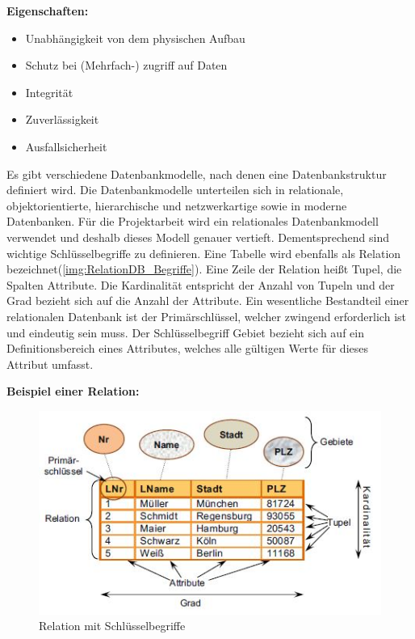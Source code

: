 \documentclass[a4paper,titlepage,halfparskip,12pt]{scrreprt}
\begin{document}
\begin{onehalfspacing}
\smallskip

\textbf{Eigenschaften:}
\begin{itemize}
	\item Unabhängigkeit von dem physischen Aufbau
	\item Schutz bei (Mehrfach-) zugriff auf Daten
	\item Integrität
	\item Zuverlässigkeit
	\item Ausfallsicherheit
\end{itemize}

Es gibt verschiedene Datenbankmodelle, nach denen eine Datenbankstruktur definiert wird. Die Datenbankmodelle unterteilen sich in relationale, objektorientierte, hierarchische und netzwerkartige sowie in moderne Datenbanken. Für die Projektarbeit wird ein relationales Datenbankmodell verwendet und deshalb dieses Modell genauer vertieft. Dementsprechend sind wichtige Schlüsselbegriffe zu definieren. Eine Tabelle wird ebenfalls als Relation bezeichnet(\autoref{img:RelationDB_Begriffe}). Eine Zeile der Relation heißt Tupel, die Spalten Attribute. Die Kardinalität entspricht der Anzahl von Tupeln und der Grad bezieht sich auf die Anzahl der Attribute. Ein wesentliche Bestandteil einer relationalen Datenbank ist der Primärschlüssel, welcher zwingend erforderlich ist und eindeutig sein muss. Der Schlüsselbegriff Gebiet bezieht sich auf ein Definitionsbereich eines Attributes, welches alle gültigen Werte für dieses Attribut umfasst. \cite{Schicker2017}

\textbf{Beispiel einer Relation:}

\smallskip

\begin{figure}[h]
	\centering
	\includegraphics[scale=1.2]{images/RelationMitSchluesselbegriffe}
	\caption{Relation mit Schlüsselbegriffe \cite{Schicker2017}}
	\label{img:RelationDB_Begriffe}
\end{figure}


\end{onehalfspacing}
\end{document}
